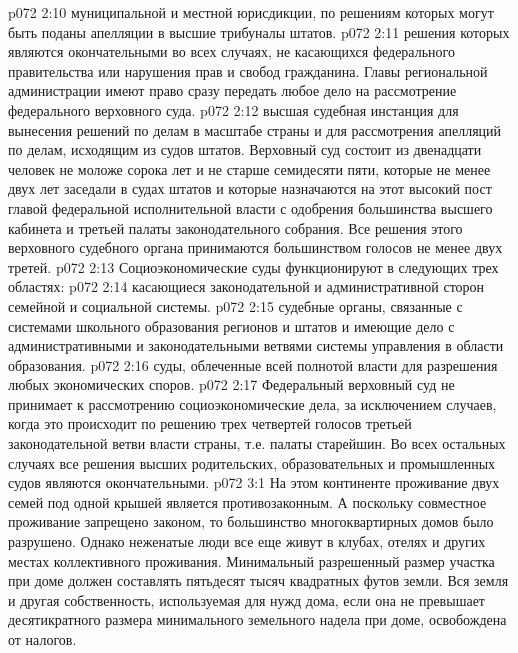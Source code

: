 \vs p072 2:10 \bibnobreakspace {} муниципальной и местной юрисдикции, по решениям которых могут быть поданы апелляции в высшие трибуналы штатов.
\vs p072 2:11 \pc {}\bibnobreakspace {} решения которых являются окончательными во всех случаях, не касающихся федерального правительства или нарушения прав и свобод гражданина. Главы региональной администрации имеют право сразу передать любое дело на рассмотрение федерального верховного суда.
\vs p072 2:12 \pc {}\bibnobreakspace {} высшая судебная инстанция для вынесения решений по делам в масштабе страны и для рассмотрения апелляций по делам, исходящим из судов штатов. Верховный суд состоит из двенадцати человек не моложе сорока лет и не старше семидесяти пяти, которые не менее двух лет заседали в судах штатов и которые назначаются на этот высокий пост главой федеральной исполнительной власти с одобрения большинства высшего кабинета и третьей палаты законодательного собрания. Все решения этого верховного судебного органа принимаются большинством голосов не менее двух третей.
\vs p072 2:13 \pc Социоэкономические суды функционируют в следующих трех областях:
\vs p072 2:14 \bibnobreakspace {} касающиеся законодательной и административной сторон семейной и социальной системы.
\vs p072 2:15 \pc {}\bibnobreakspace {} судебные органы, связанные с системами школьного образования регионов и штатов и имеющие дело с административными и законодательными ветвями системы управления в области образования.
\vs p072 2:16 \pc {}\bibnobreakspace {} суды, облеченные всей полнотой власти для разрешения любых экономических споров.
\vs p072 2:17 \pc Федеральный верховный суд не принимает к рассмотрению социоэкономические дела, за исключением случаев, когда это происходит по решению трех четвертей голосов третьей законодательной ветви власти страны, т.е. палаты старейшин. Во всех остальных случаях все решения высших родительских, образовательных и промышленных судов являются окончательными.
\vs p072 3:1 На этом континенте проживание двух семей под одной крышей является противозаконным. А поскольку совместное проживание запрещено законом, то большинство многоквартирных домов было разрушено. Однако неженатые люди все еще живут в клубах, отелях и других местах коллективного проживания. Минимальный разрешенный размер участка при доме должен составлять пятьдесят тысяч квадратных футов земли. Вся земля и другая собственность, используемая для нужд дома, если она не превышает десятикратного размера минимального земельного надела при доме, освобождена от налогов.
